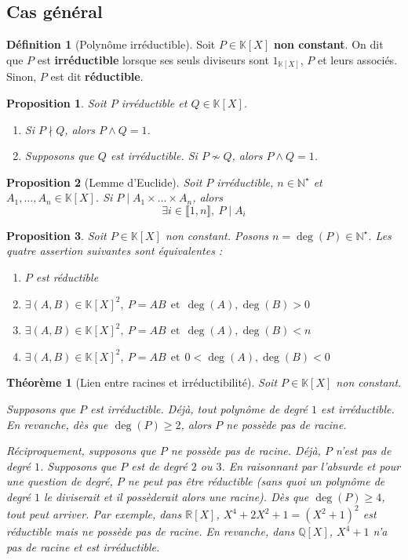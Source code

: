 \documentclass[french]{book}
\newcommand{\N}{\mathbb{N}}
\newcommand{\Q}{\mathbb{Q}}
\newcommand{\R}{\mathbb{R}}
\newcommand{\K}{\mathbb{K}}
\newcommand{\st}{^\star}
\theoremstyle{plain}
\newtheorem{thm}{Théorème}[chapter]
\newtheorem{prop}{Proposition}[chapter]
\theoremstyle{definition}
\newtheorem{dfn}{Définition}[chapter]
\theoremstyle{remark}
\begin{document}
\subsection{Cas général}
\begin{dfn}[Polynôme irréductible]
	Soit $P\in\K[X]$ \textbf{non constant}. On dit que $P$ est \textbf{irréductible} lorsque ses seuls diviseurs sont $1_{\K[X]}$, $P$ et leurs associés. Sinon, $P$ est dit \textbf{réductible}.
\end{dfn}
\begin{prop}
	Soit $P$ irréductible et $Q\in\K[X]$.
	\begin{enumerate}
		\item Si $P\nmid Q$, alors $P\wedge Q=1$.
		\item Supposons que $Q$ est irréductible. Si $P\nsim Q$, alors $P\wedge Q=1$.
	\end{enumerate}
\end{prop}
\begin{prop}[Lemme d'Euclide]
	Soit $P$ irréductible, $n\in\N\st$ et $A_1,\ldots,A_n\in\K[X]$. Si $P\mid A_1\times\ldots\times A_n$, alors $$\exists i\in\llbracket1,n\rrbracket,\ P\mid A_i$$
\end{prop}
\begin{prop}
	Soit $P\in\K[X]$ non constant. Posons $n=\deg(P)\in\N\st$. Les quatre assertion suivantes sont équivalentes :
	\begin{enumerate}
		\item $P$ est réductible
		\item $\exists(A,B)\in\K[X]^2,\ P=AB \ \ \text{et} \ \ \deg(A),\deg(B)>0$
		\item $\exists(A,B)\in\K[X]^2,\ P=AB \ \ \text{et} \ \ \deg(A),\deg(B)<n$
		\item $\exists(A,B)\in\K[X]^2,\ P=AB \ \ \text{et} \ \ 0<\deg(A),\deg(B)<0$
	\end{enumerate}
\end{prop}
\begin{thm}[Lien entre racines et irréductibilité]
	Soit $P\in\K[X]$ non constant. \par Supposons que $P$ est irréductible. Déjà, tout polynôme de degré $1$ est irréductible. En revanche, dès que $\deg(P)\geqslant2$, alors $P$ ne possède pas de racine. \par Réciproquement, supposons que $P$ ne possède pas de racine. Déjà, $P$ n'est pas de degré $1$. Supposons que $P$ est de degré $2$ ou $3$. En raisonnant par l'absurde et pour une question de degré, $P$ ne peut pas être réductible (sans quoi un polynôme de degré $1$ le diviserait et il possèderait alors une racine).  Dès que $\deg(P)\geqslant4$, tout peut arriver. Par exemple, dans $\R[X]$, $X^4+2X^2+1=(X^2+1)^2$ est réductible mais ne possède pas de racine. En revanche, dans $\Q[X]$, $X^4+1$ n'a pas de racine et est irréductible.
\end{thm}
\end{document}
